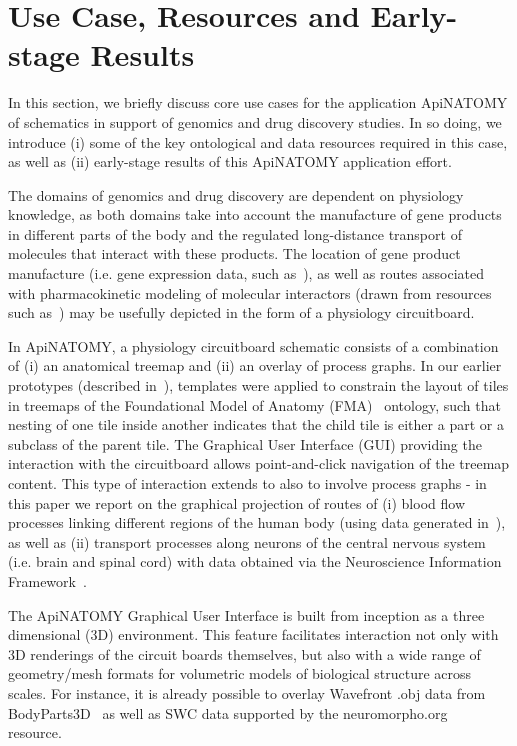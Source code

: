\section{Use Case, Resources and Early-stage Results} \label{sect:motivation}            %

In this section, we briefly discuss core use cases for the application ApiNATOMY of schematics in support of genomics and drug discovery studies. In so doing, we introduce (i) some of the key ontological and data resources required in this case, as well as (ii) early-stage results of this ApiNATOMY application effort.

The domains of genomics and drug discovery are dependent on physiology knowledge, as both domains take into account the manufacture of gene products in different parts of the body and the regulated long-distance transport of molecules that interact with these products. The location of gene product manufacture (i.e. gene expression data, such as~\cite{EBI}), as well as routes associated with pharmacokinetic modeling of molecular interactors (drawn from resources such as~\cite{HMC+13}) may be usefully depicted in the form of a physiology circuitboard.

In ApiNATOMY, a physiology circuitboard schematic consists of a combination of (i) an anatomical treemap and (ii) an overlay of process graphs. In our earlier prototypes (described in~\cite{BGS12}\cite{KBK14}), templates were applied to constrain the layout of tiles in treemaps of the Foundational Model of Anatomy (FMA)~\cite{RM03} ontology, such that nesting of one tile inside another indicates that the child tile is either a part or a subclass of the parent tile. The Graphical User Interface (GUI) providing the interaction with the circuitboard allows point-and-click navigation of the treemap content. This type of interaction extends to also to involve process graphs - in this paper we report on the graphical projection of routes of (i) blood flow processes linking different regions of the human body (using data generated in~\cite{deB11}), as well as (ii) transport processes along neurons of the central nervous system (i.e. brain and spinal cord) with data obtained via the Neuroscience Information Framework~\cite{Gar+08}.

The ApiNATOMY Graphical User Interface is built from inception as a three dimensional (3D) environment. This feature facilitates interaction not only with 3D renderings of the circuit boards themselves, but also with a wide range of geometry/mesh formats for volumetric models of biological structure across scales. For instance, it is already possible to overlay Wavefront .obj data from BodyParts3D~\cite{MFT+09} as well as SWC data supported by the neuromorpho.org~\cite{Asc06} resource.

